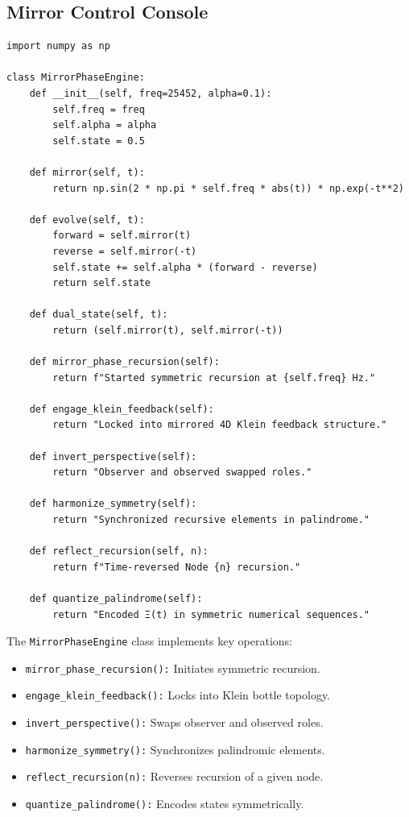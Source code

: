 \documentclass[12pt]{article}
\begin{document}
\subsection{Mirror Control Console}
\begin{algorithm}
\caption{MirrorPhaseEngine}
\begin{lstlisting}
import numpy as np

class MirrorPhaseEngine:
    def __init__(self, freq=25452, alpha=0.1):
        self.freq = freq
        self.alpha = alpha
        self.state = 0.5

    def mirror(self, t):
        return np.sin(2 * np.pi * self.freq * abs(t)) * np.exp(-t**2)

    def evolve(self, t):
        forward = self.mirror(t)
        reverse = self.mirror(-t)
        self.state += self.alpha * (forward - reverse)
        return self.state

    def dual_state(self, t):
        return (self.mirror(t), self.mirror(-t))

    def mirror_phase_recursion(self):
        return f"Started symmetric recursion at {self.freq} Hz."

    def engage_klein_feedback(self):
        return "Locked into mirrored 4D Klein feedback structure."

    def invert_perspective(self):
        return "Observer and observed swapped roles."

    def harmonize_symmetry(self):
        return "Synchronized recursive elements in palindrome."

    def reflect_recursion(self, n):
        return f"Time-reversed Node {n} recursion."

    def quantize_palindrome(self):
        return "Encoded Ξ(t) in symmetric numerical sequences."
\end{lstlisting}
\end{algorithm}
The \texttt{MirrorPhaseEngine} class implements key operations:
\begin{itemize}
    \item \texttt{mirror\_phase\_recursion():} Initiates symmetric recursion.
    \item \texttt{engage\_klein\_feedback():} Locks into Klein bottle topology.
    \item \texttt{invert\_perspective():} Swaps observer and observed roles.
    \item \texttt{harmonize\_symmetry():} Synchronizes palindromic elements.
    \item \texttt{reflect\_recursion(n):} Reverses recursion of a given node.
    \item \texttt{quantize\_palindrome():} Encodes states symmetrically.
\end{itemize}
\end{document}
